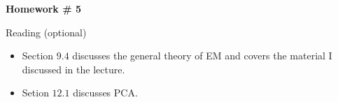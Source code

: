 \documentclass{article}
\begin{document}
\renewcommand{\a}{\textbf{a}}
\renewcommand{\b}{\textbf{b}}
\renewcommand{\d}{\textbf{d}}
\newcommand{\e}{\textbf{e}}

\renewcommand{\Xi}{X^{(i)}}
\newcommand{\Yi}{\hat{Y}_i}
\newcommand{\hS}{\hat{\Sigma}}

\large

\begin{center}
\textbf{Homework \# 5} \\  
\end{center}

\medskip


\medskip

Reading (optional)
\begin{itemize}
\item Section $9.4$ discusses the general theory of EM and covers the material I discussed in the lecture.
\item Setion $12.1$ discusses PCA.
\end{itemize}
\end{document}
